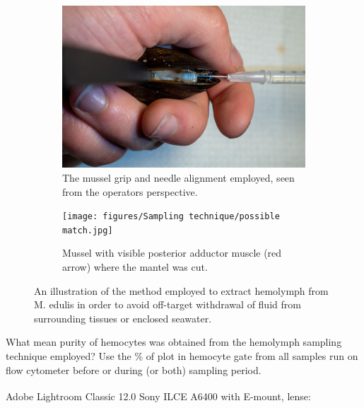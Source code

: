 \begin{figure}
\begin{subfigure}[b]{.45\textwidth}
        \centering
        \includegraphics[width=\textwidth]{figures/Sampling technique/hands colors centered.jpg}
        \caption{The mussel grip and needle alignment employed, seen from the operators perspective. }
        \label{sfig:c}
    \end{subfigure}
    \hfill
    \begin{subfigure}[b]{.45\textwidth}
        \centering
        \texttt{[image: figures/Sampling technique/possible match.jpg]}
        \caption{Mussel with visible posterior adductor muscle (red arrow) where the mantel was cut.}
        \label{sfig:d}
    \end{subfigure}
    \caption{An illustration of the method employed to extract hemolymph from M. edulis in order to avoid off-target withdrawal of fluid from surrounding tissues or enclosed seawater.}
    \label{fig:Hemolymph_sampling_illustration}
\end{figure}


What mean purity of hemocytes was obtained from the hemolymph sampling technique employed? Use the \% of plot in hemocyte gate from all samples run on flow cytometer before or during (or both) sampling period.

Adobe\textsuperscript{\textregistered} Lightroom Classic 12.0 
Sony ILCE A6400 with E-mount, lense:  